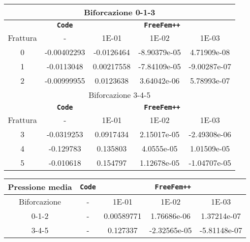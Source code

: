 \begin{center}
\begin{tabular}{|c|c|c|c|c|}
\hline
\multicolumn{5}{|c|}{Biforcazione 0-1-3}\\
\hline
 & \textbf{\texttt{Code}} & \multicolumn{3}{|c|}{\textbf{\texttt{FreeFem++}}} \\
\hline
\multicolumn{1}{|c|}{Frattura} & - &
\multicolumn{1}{|c|}{1E-01} & 1E-02 & 1E-03 \\
\hline
 0 & -0.00402293 & -0.0126464 & -8.90379e-05 & 4.71909e-08\\
 1 & -0.0113048 & 0.00217558 & -7.84109e-05 & -9.00287e-07\\  
 2 & -0.00999955 & 0.0123638 & 3.64042e-06 & 5.78993e-07\\
\hline
\multicolumn{5}{|c|}{Biforcazione 3-4-5}\\
\hline
 & \textbf{\texttt{Code}} & \multicolumn{3}{|c|}{\textbf{\texttt{FreeFem++}}} \\
\hline
\multicolumn{1}{|c|}{Frattura} & - &
\multicolumn{1}{|c|}{1E-01} & 1E-02 & 1E-03 \\
\hline
 3 & -0.0319253 & 0.0917434 & 2.15017e-05 & -2.49308e-06\\ 
 4 & -0.129783 & 0.135803 & 4.0555e-05 & 1.01509e-05\\
 5 & -0.010618 & 0.154797 & 1.12678e-05 & -1.04707e-05\\
\hline
\end{tabular}
\end{center}

\begin{center}
\begin{tabular}{|c|c|c|c|c|}
\hline
 Pressione media & \textbf{\texttt{Code}} & \multicolumn{3}{|c|}{\textbf{\texttt{FreeFem++}}} \\ 
\hline
\multicolumn{1}{|c|}{Biforcazione} & - &
\multicolumn{1}{|c|}{1E-01} & 1E-02 & 1E-03 \\
\hline
  0-1-2 & - & 0.00589771 & 1.76686e-06 & 1.37214e-07 \\
  3-4-5 & - & 0.127337 & -2.32565e-05 & -5.81148e-07 \\
\hline
\end{tabular}
\end{center}
